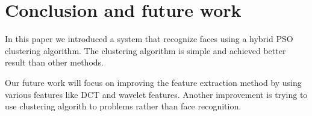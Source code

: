 \documentclass[a4paper,twoside]{article}
\begin{document}
\section{Conclusion and future work}
\label{sec:Conclusion}
In this paper we introduced a system that recognize faces using a hybrid PSO clustering algorithm. The clustering algorithm is simple and achieved better result than other methods.


Our future work will focus on improving the feature extraction method by using various features like DCT and wavelet features. Another improvement is trying to use clustering algorith to problems rather than face recognition.




%

\end{document}
